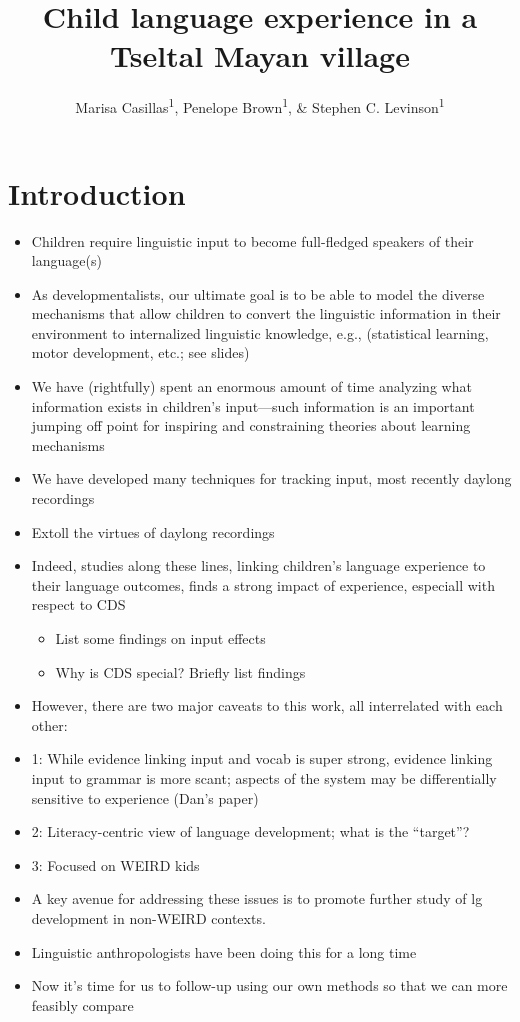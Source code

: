\documentclass[man]{apa6}
\title{Child language experience in a Tseltal Mayan village}
\author{Marisa Casillas\textsuperscript{1}, Penelope Brown\textsuperscript{1}, \& Stephen C. Levinson\textsuperscript{1}}
\affiliation{
    \vspace{0.5cm}
          \textsuperscript{1} Max Planck Institute for Psycholinguistics  }
\providecommand{\tightlist}{%
  \setlength{\itemsep}{0pt}\setlength{\parskip}{0pt}}
\theoremstyle{definition}
\theoremstyle{definition}
\theoremstyle{definition}
\theoremstyle{remark}
\begin{document}
\maketitle

\setcounter{secnumdepth}{0}



\section{Introduction}\label{introduction}

\begin{itemize}
\tightlist
\item
  Children require linguistic input to become full-fledged speakers of
  their language(s)
\item
  As developmentalists, our ultimate goal is to be able to model the
  diverse mechanisms that allow children to convert the linguistic
  information in their environment to internalized linguistic knowledge,
  e.g., (statistical learning, motor development, etc.; see slides)
\item
  We have (rightfully) spent an enormous amount of time analyzing what
  information exists in children's input---such information is an
  important jumping off point for inspiring and constraining theories
  about learning mechanisms
\item
  We have developed many techniques for tracking input, most recently
  daylong recordings
\item
  Extoll the virtues of daylong recordings
\item
  Indeed, studies along these lines, linking children's language
  experience to their language outcomes, finds a strong impact of
  experience, especiall with respect to CDS

  \begin{itemize}
  \tightlist
  \item
    List some findings on input effects
  \item
    Why is CDS special? Briefly list findings
  \end{itemize}
\item
  However, there are two major caveats to this work, all interrelated
  with each other:
\item
  1: While evidence linking input and vocab is super strong, evidence
  linking input to grammar is more scant; aspects of the system may be
  differentially sensitive to experience (Dan's paper)
\item
  2: Literacy-centric view of language development; what is the
  \enquote{target}?
\item
  3: Focused on WEIRD kids
\item
  A key avenue for addressing these issues is to promote further study
  of lg development in non-WEIRD contexts.
\item
  Linguistic anthropologists have been doing this for a long time
\item
  Now it's time for us to follow-up using our own methods so that we can
  more feasibly compare


\end{itemize}
\end{document}
